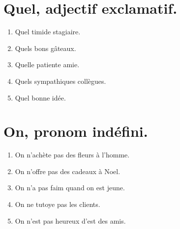 \section{Quel, adjectif exclamatif.}

\begin{enumerate}
    \item Quel timide stagiaire.
    \item Quels bons gâteaux.
    \item Quelle patiente amie.
    \item Quels sympathiques collègues.
    \item Quel bonne idée.
\end{enumerate}

\section{On, pronom indéfini.}

\begin{enumerate}
    \item On n'achète pas des fleurs à l'homme.
    \item On n'offre pas des cadeaux à Noel.
    \item On n'a pas faim quand on est jeune.
    \item On ne tutoye pas les clients.
    \item On n'est pas heureux d'est des amis.
\end{enumerate}